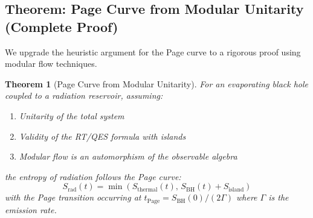 \documentclass[12pt,a4paper]{article}
\newtheorem{theorem}{Theorem}[section]
\begin{document}
\subsection{Theorem: Page Curve from Modular Unitarity (Complete Proof)}

We upgrade the heuristic argument for the Page curve to a rigorous proof using modular flow techniques.

\begin{theorem}[Page Curve from Modular Unitarity]\label{thm:page-curve}
For an evaporating black hole coupled to a radiation reservoir, assuming:
\begin{enumerate}
    \item Unitarity of the total system
    \item Validity of the RT/QES formula with islands
    \item Modular flow is an automorphism of the observable algebra
\end{enumerate}
the entropy of radiation follows the Page curve:
\begin{equation}
S_{\text{rad}}(t) = \min\left( S_{\text{thermal}}(t), \, S_{\text{BH}}(t) + S_{\text{island}} \right)
\end{equation}
with the Page transition occurring at $t_{\text{Page}} = S_{\text{BH}}(0)/(2\Gamma)$ where $\Gamma$ is the emission rate.
\end{theorem}
\end{document}
